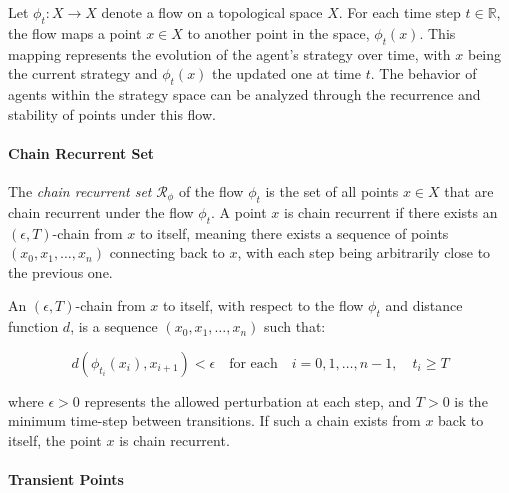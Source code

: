 \begin{flushleft}
\begin{flushleft}
        Let $\phi_t: X \rightarrow X$ denote a flow on a topological space $X$. For each time step $t \in \mathbb{R}$, the flow maps a point $x \in X$ to another point in the space, $\phi_t(x)$. This mapping represents the evolution of the agent’s strategy over time, with $x$ being the current strategy and $\phi_t(x)$ the updated one at time $t$. The behavior of agents within the strategy space can be analyzed through the recurrence and stability of points under this flow.
        
        \paragraph{Chain Recurrent Set}

        \begin{flushleft}

            The \emph{chain recurrent set} $\mathcal{R}_\phi$ of the flow $\phi_t$ is the set of all points $x \in X$ that are chain recurrent under the flow $\phi_t$. A point $x$ is chain recurrent if there exists an $(\epsilon, T)$-chain from $x$ to itself, meaning there exists a sequence of points $(x_0, x_1, \dots, x_n)$ connecting back to $x$, with each step being arbitrarily close to the previous one.

            \begin{definition}
                An $(\epsilon, T)$-chain from $x$ to itself, with respect to the flow $\phi_t$ and distance function $d$, is a sequence $(x_0, x_1, \dots, x_n)$ such that:

                \begin{equation}
                    d(\phi_{t_i}(x_i), x_{i+1}) < \epsilon \quad \text{for each} \quad i = 0, 1, \dots, n-1, \quad t_i \geq T
                    \nonumber
                \end{equation}

                where $\epsilon > 0$ represents the allowed perturbation at each step, and $T > 0$ is the minimum time-step between transitions. If such a chain exists from $x$ back to itself, the point $x$ is chain recurrent.
            \end{definition}

        \end{flushleft}

        \paragraph{Transient Points}


\end{flushleft}
\end{flushleft}
